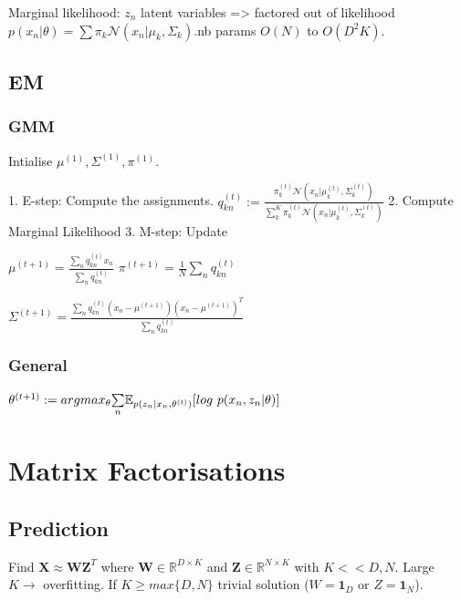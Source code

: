 Marginal likelihood: $z_n$ latent variables => factored out of likelihood \newline $p(x_n|\theta) = \sum \pi_k \mathcal{N}(x_n|\mu_k, \Sigma_k)$.\newline nb params $O(N)$ to $O(D^2K)$.

\subsection{EM}
\subsubsection{GMM}
Intialise $\mu^{(1)}, \Sigma^{(1)}, \pi^{(1)}$.

1. E-step: Compute the assignments. $q_{kn}^{(t)} := \frac{\pi_k^{(t)} \mathcal{N}(x_n|\mu_k^{(t)}, \Sigma_k^{(t)})}{ \sum_k^K\pi_k^{(t)} \mathcal{N}(x_n|\mu_k^{(t)}, \Sigma_k^{(t)}) }$
2. Compute Marginal Likelihood
3. M-step: Update

$\mu^{(t+1)} = \frac{\underset{n}{\sum} q_{kn}^{(t)} x_n}{\underset{n}{\sum} q_{kn}^{(t)}}$ $\pi^{(t+1)} = \frac{1}{N} \underset{n}{\sum} q_{kn}^{(t)}$

$\Sigma^{(t+1)} = \frac{\underset{n}{\sum} q_{kn}^{(t)}(x_n - \mu^{(t+1)})(x_n - \mu^{(t+1)})^T}{\underset{n}{\sum} q_{kn}^{(t)}}$
\newline

\subsubsection{General}
$\theta^{(t+1)} := argmax_{\theta} \underset{n}{\sum} \mathbb{E}_{p(z_n|x_n,\theta^{(t)})}\newline[log\,\, p(x_n,z_n|\theta)]$\newline

\section{Matrix Factorisations}
\subsection{Prediction}
Find $\mathbf{X} \approx \mathbf{W}\mathbf{Z}^T$ where $\mathbf{W} \in \mathbb{R}^{D\times K}$ and $\mathbf{Z} \in \mathbb{R}^{N\times K}$ with $K << D,N$. Large $K\rightarrow$ overfitting. If $K \ge max\{D,N\}$ trivial solution ($W=\mathbf{1}_D$ or $Z=\mathbf{1}_N$).

